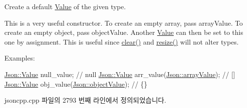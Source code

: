 Create a default \hyperlink{class_json_1_1_value}{Value} of the given type. 

This is a very useful constructor. To create an empty array, pass array\+Value. To create an empty object, pass object\+Value. Another \hyperlink{class_json_1_1_value}{Value} can then be set to this one by assignment. This is useful since \hyperlink{class_json_1_1_value_a501a4d67e6c875255c2ecc03ccd2019b}{clear()} and \hyperlink{class_json_1_1_value_aa284353271ada427dbfa04a42f2be407}{resize()} will not alter types. \begin{DoxyVerb}Examples:
\end{DoxyVerb}
 
\begin{DoxyCode}
\hyperlink{class_json_1_1_value}{Json::Value} null\_value; \textcolor{comment}{// null}
\hyperlink{class_json_1_1_value}{Json::Value} arr\_value(\hyperlink{namespace_json_a7d654b75c16a57007925868e38212b4eadc8f264f36b55b063c78126b335415f4}{Json::arrayValue}); \textcolor{comment}{// []}
\hyperlink{class_json_1_1_value}{Json::Value} obj\_value(\hyperlink{namespace_json_a7d654b75c16a57007925868e38212b4eae8386dcfc36d1ae897745f7b4f77a1f6}{Json::objectValue}); \textcolor{comment}{// \{\}}
\end{DoxyCode}
 

jsoncpp.\+cpp 파일의 2793 번째 라인에서 정의되었습니다.


